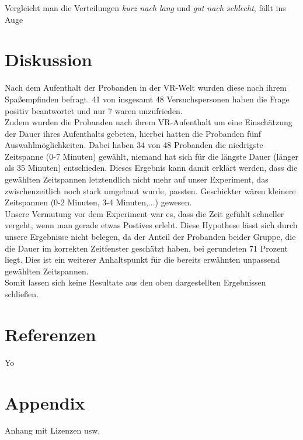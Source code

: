 \documentclass{Paper}
\begin{document}
Vergleicht man die Verteilungen \textit{kurz nach lang} und \textit{gut nach schlecht}, fällt ins Auge	

\section{Diskussion}
Nach dem Aufenthalt der Probanden in der VR-Welt wurden diese nach ihrem Spaßempfinden befragt. 41 von insgesamt 48 Versuchspersonen haben die Frage positiv beantwortet und nur 7 waren unzufrieden.\\
Zudem wurden die Probanden nach ihrem VR-Aufenthalt um eine Einschätzung der Dauer ihres Aufenthalts gebeten, hierbei hatten die Probanden fünf Auswahlmöglichkeiten. Dabei haben 34 von 48 Probanden die niedrigste Zeitspanne (0-7 Minuten) gewählt, niemand hat sich für die längste Dauer (länger als 35 Minuten) entschieden. Dieses Ergebnis kann damit erklärt werden, dass die gewählten Zeitspannen letztendlich nicht mehr auf unser Experiment, das zwischenzeitlich noch stark umgebaut wurde, passten. Geschickter wären kleinere Zeitspannen (0-2 Minuten, 3-4 Minuten,...) gewesen.\\
Unsere Vermutung vor dem Experiment war es, dass die Zeit gefühlt schneller vergeht, wenn man gerade etwas Postives erlebt. Diese Hypothese lässt sich durch unsere Ergebnisse nicht belegen, da der Anteil der Probanden beider Gruppe, die die Dauer im korrekten Zeitfenster geschätzt haben, bei gerundeten 71 Prozent liegt. Dies ist ein weiterer Anhaltspunkt für die bereits erwähnten unpassend gewählten Zeitspannen.\\
Somit lassen sich keine Resultate aus den oben dargestellten Ergebnissen schließen.

\section{Referenzen}
	Yo
	
\section{Appendix} %
	Anhang mit Lizenzen usw.
	
\vfill %

\printbibliography
\end{document}

